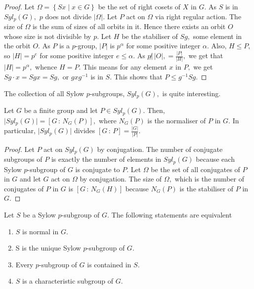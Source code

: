 \begin{proof}
	Let $ \Omega  =  \left\{ S x \; | \; x \in G  \right\}$
	be the set of right cosets of $X$ in $G.$
	As $S$ is in $Syl_p(G),$ $p$ does not divide $ \lvert \Omega
	\rvert.$
	Let $P$ act on $ \Omega $ via right regular  action.
	The size of $ \Omega $ is the sum of sizes of all orbits in it. 
	Hence there exists an orbit $O$ whose size is not divisible by $p.$
	Let $H$ be the stabiliser of $Sg,$ some element in the
	orbit $O.$
	As $P$ is a $p$\nobreakdash-group, $ \lvert P \rvert$
	is $p^\alpha$ for some positive integer $\alpha.$
	Also, $H \leq P,$ so $ \lvert H \rvert = p^e$ for some positive
	integer $e \leq \alpha.$
	As $p \not | \, \lvert O \rvert, = 
	\frac{ \lvert P \rvert}{ \lvert H \rvert},$ we get that
	$ \lvert H \rvert = p^ \alpha,$ whence $H = P.$ This means
	for any element $x$ in $P,$ we get $Sg \cdot x = Sgx = Sg,$
	or $g x g^{-1}$ is in $S.$ This shows that $P \leq g^{-1} S g.$
	\end{proof}

The collection of all Sylow $p$\nobreakdash-subgroups, $Syl_p(G),$ is quite interesting.

\begin{corollary} \label{cor:number-of-sylow-p-subgroups}
	Let $G$ be a finite group and let $P \in Syl_p(G).$ Then, $ \lvert Syl_p(G) \rvert 
	= \left[ G \, : \, N_G(P) \right] ,$
	where $N_G(P) $ is the normaliser of $P$ in $G.$
	In particular, $ \lvert Syl_p(G) \rvert $ divides $ \left[ G \, : \, P \right] 
	= \frac{ \lvert G \rvert } { \lvert P \rvert }.$
\end{corollary}

\begin{proof}
	Let $P$ act on $Syl_p(G)$ by conjugation.
	The number of conjugate subgroups of $P$ is exactly the number of 
	elements in $Syl_p(G)$
	because each Sylow $p$\nobreakdash-subgroup of $G$ is conjugate to $P.$
	Let $ \Omega$ be the set of all conjugates of $P$ in $G$ and let 
	$G$ act on $ \Omega$ by conjugation.
	The size of $ \Omega ,$ which is the number of conjugates of $P$ in $G$ 
	is $ \left[ G \, : \, N_G(H) \right] $ because $N_G(P) $ is the
	stabiliser of $P$ in $G.$
\end{proof}

\begin{corollary}\label{cor:normal-sylow-p-subgroups}
	Let $ S$ be a Sylow $p$\nobreakdash-subgroup of $G.$
	The following statements are equivalent
	\begin{enumerate}
		\item $S$ is normal in $G.$
		\item S is the unique Sylow $p$\nobreakdash-subgroup of $G.$
		\item Every $p$\nobreakdash-subgroup of $G$ is contained in $S.$
		\item $S$ is a characteristic subgroup of $G.$
	\end{enumerate}
\end{corollary}

